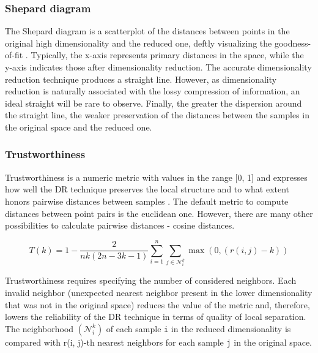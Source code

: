 \documentclass[12pt]{article}
\begin{document}
\subsubsection{Shepard diagram}
The Shepard diagram is a scatterplot of the distances between points in the original high dimensionality and the reduced one, deftly visualizing the goodness-of-fit \cite{JakeHoare}. Typically, the x-axis represents primary distances in the space, while the y-axis indicates those after dimensionality reduction. The accurate dimensionality reduction technique produces a straight line. However, as dimensionality reduction is naturally associated with the lossy compression of information, an ideal straight will be rare to observe. Finally, the greater the dispersion around the straight line, the weaker preservation of the distances between the samples in the original space and the reduced one.

\clearpage
\subsubsection{Trustworthiness}
Trustworthiness is a numeric metric with values in the range [0, 1] and expresses how well the DR technique preserves the local structure and to what extent honors pairwise distances between samples \cite{trst}. The default metric to compute distances between point pairs is the euclidean one. However, there are many other possibilities to calculate pairwise distances - cosine distances. 

\begin{equation}
T(k) = 1 - \frac{2}{nk (2n - 3k - 1)} \sum^n_{i=1}
    \sum_{j \in \mathcal{N}_{i}^{k}} \max(0, (r(i, j) - k))
\end{equation}

Trustworthiness requires specifying the number of considered neighbors. Each invalid neighbor (unexpected nearest neighbor present in the lower dimensionality that was not in the original space) reduces the value of the metric and, therefore, lowers the reliability of the DR technique in terms of quality of local separation. The neighborhood $(\mathcal{N}_{i}^{k})$ of each sample \verb|i| in the reduced dimensionality is compared with r(i, j)-th nearest neighbors for each sample \verb|j| in the original space.
\end{document}
